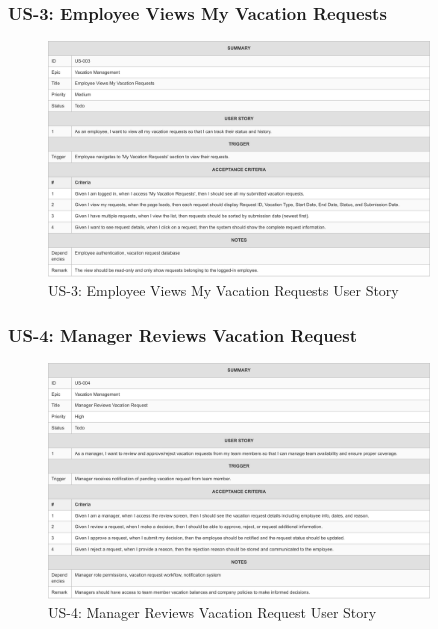 \documentclass[12pt,a4paper]{article}
\begin{document}
\subsubsection{US-3: Employee Views My Vacation Requests}
\begin{figure}[H]
\centering
\includegraphics[width=0.9\textwidth]{User-Stories/US-3-Employee-Views-My-Vacation-Requests/US-3-Employee-Views-My-Vacation-Requests-1.png}
\caption{US-3: Employee Views My Vacation Requests User Story}
\label{fig:us3}
\end{figure}

\subsubsection{US-4: Manager Reviews Vacation Request}
\begin{figure}[H]
\centering
\includegraphics[width=0.9\textwidth]{User-Stories/US-4-Manager-Reviews-Vacation-Request/US-4-Manager-Reviews-Vacation-Request-1.png}
\caption{US-4: Manager Reviews Vacation Request User Story}
\label{fig:us4}
\end{figure}
\end{document}
